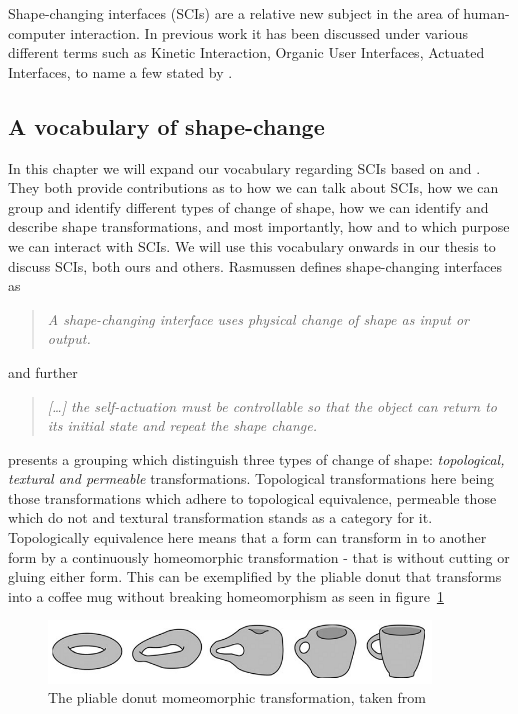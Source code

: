 

Shape-changing interfaces (SCIs) are a relative new subject in the area of human-computer interaction.
In previous work it has been discussed under various different terms such as Kinetic Interaction, Organic User Interfaces, Actuated Interfaces, to name a few stated by \citet{rasmussen2012shape}.

\subsection{A vocabulary of shape-change}
\label{ch:jamming:vocabulary}
In this chapter we will expand our vocabulary regarding SCIs based on \citet{coelho2011shape} and \citet{rasmussen2012shape}.
They both provide contributions as to how we can talk about SCIs, how we can group and identify different types of change of shape, how we can identify and describe shape transformations, and most importantly, how and to which purpose we can interact with SCIs.
We will use this vocabulary onwards in our thesis to discuss SCIs, both ours and others.   
Rasmussen defines shape-changing interfaces as
\begin{quotation}
  \emph{A shape-changing interface uses physical change of shape as input or output.}
\end{quotation}
and further
\begin{quotation}
  \emph{[\ldots] the self-actuation must be controllable so that the object can return to its initial state and repeat the shape change. }  
\end{quotation}

\citeauthor{coelho2011shape} presents a grouping which distinguish three types of change of shape: \emph{topological, textural and permeable} transformations.
Topological transformations here being those transformations which adhere to topological equivalence, permeable those which do not and textural transformation stands as a category for it. Topologically equivalence here means that a form can transform in to another form by a continuously homeomorphic transformation - that is without cutting or gluing either form. This can be exemplified by the pliable donut that transforms into a coffee mug without breaking homeomorphism as seen in figure~\ref{pliable-mug}  

\begin{figure}[hb]
	\centering
  		\includegraphics[width=4in]{figures/pliable-donut}
	\caption[The pliable donut momeomorphic transformation, taken from \citep{coelho2011shape}]
   {The pliable donut momeomorphic transformation, taken from \citep{coelho2011shape}}
   \label{pliable-mug}
\end{figure}   
 
